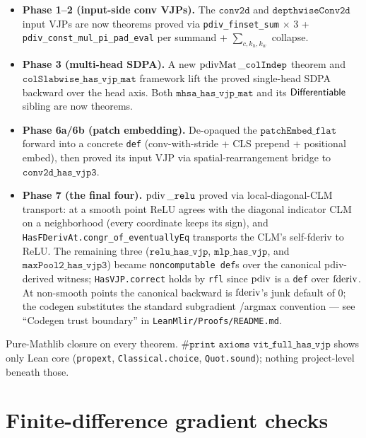 \begin{itemize}
  \item \textbf{Phase 1--2 (input-side conv VJPs).} The
    \(\texttt{conv2d}\) and \(\texttt{depthwiseConv2d}\) input
    VJPs are now theorems proved via
    \texttt{pdiv\_finset\_sum} \(\times\) 3 +
    \texttt{pdiv\_const\_mul\_pi\_pad\_eval} per summand +
    \(\sum_{c, k_h, k_w}\) collapse.
  \item \textbf{Phase 3 (multi-head SDPA).} A new
    \(\operatorname{pdivMat}\_\texttt{colIndep}\) theorem and
    \(\texttt{colSlabwise\_has\_vjp\_mat}\) framework lift the
    proved single-head SDPA backward over the head axis. Both
    \(\texttt{mhsa\_has\_vjp\_mat}\) and its
    \(\mathsf{Differentiable}\) sibling are now theorems.
  \item \textbf{Phase 6a/6b (patch embedding).} De-opaqued the
    \(\texttt{patchEmbed\_flat}\) forward into a concrete
    \texttt{def} (conv-with-stride + CLS prepend + positional
    embed), then proved its input VJP via spatial-rearrangement
    bridge to \(\texttt{conv2d\_has\_vjp3}\).
  \item \textbf{Phase 7 (the final four).}
    \(\operatorname{pdiv}\_\texttt{relu}\) proved via local-diagonal-CLM
    transport: at a smooth point ReLU agrees with the diagonal
    indicator CLM on a neighborhood (every coordinate keeps its
    sign), and \texttt{HasFDerivAt.congr\_of\_eventuallyEq}
    transports the CLM's self-fderiv to ReLU. The remaining
    three (\(\texttt{relu\_has\_vjp}\),
    \(\texttt{mlp\_has\_vjp}\), and
    \(\texttt{maxPool2\_has\_vjp3}\)) became
    \texttt{noncomputable def}s over the canonical pdiv-derived
    witness; \texttt{HasVJP.correct} holds by \texttt{rfl} since
    \(\operatorname{pdiv}\) is a \texttt{def} over \(\operatorname{fderiv}\). At non-smooth
    points the canonical backward is \(\operatorname{fderiv}\)'s junk default
    of \(0\); the codegen substitutes the standard subgradient
    /argmax convention --- see ``Codegen trust boundary'' in
    \texttt{LeanMlir/Proofs/README.md}.
\end{itemize}

Pure-Mathlib closure on every theorem.
\(\texttt{\#print axioms vit\_full\_has\_vjp}\) shows only Lean
core (\texttt{propext}, \texttt{Classical.choice},
\texttt{Quot.sound}); nothing project-level beneath those.

\section{Finite-difference gradient checks}

